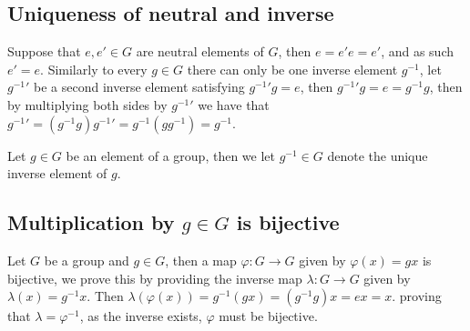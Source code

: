 \subsection{Uniqueness of neutral and inverse}
Suppose that $e,e'\in G$ are neutral elements of $G$, then $e=e'e=e'$, and as such $e'=e$. Similarly to every $g\in G$ there can only be one inverse element $g^{-1}$, let $g^{-1}'$ be a second inverse element satisfying $g^{-1}'g=e$, then $g^{-1}'g=e=g^{-1}g$, then by multiplying both sides by $g^{-1}'$ we have that $g^{-1}'=(g^{-1}g)g^{-1}'=g^{-1}(gg^{-1})=g^{-1}$.
\begin{defi}
    Let $g\in G$ be an element of a group, then we let $g^{-1}\in G$ denote the unique inverse element of $g$.
\end{defi}
\subsection{Multiplication by $g\in G$ is bijective}
Let $G$ be a group and $g\in G$, then a map $\varphi:G\rightarrow G$ given by $\varphi(x)=gx$ is bijective, we prove this by providing the inverse map $\lambda:G\rightarrow G$ given by $\lambda(x)=g^{-1}x$. Then $\lambda(\varphi(x))=g^{-1}(gx)=(g^{-1}g)x=ex=x$. proving that $\lambda=\varphi^{-1}$, as the inverse exists, $\varphi$ must be bijective.
